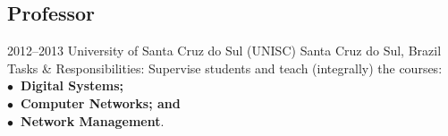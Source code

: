 \documentclass[print]{styles/friggeri-cv-mac} %
\begin{document}
\subsection{Professor}\vspace{-5pt}
\begin{entrylist}
	\entry
	{2012--2013}
	{University of Santa Cruz do Sul (UNISC)}
	{Santa Cruz do Sul, Brazil}
	{Tasks \& Responsibilities: Supervise students and teach (integrally) the courses: \\
		\textbf{$\bullet$~Digital Systems;\\$\bullet$~Computer Networks; and\\$\bullet$~Network Management}.} 
\end{entrylist}
%
%
%
%
%

\end{document}
